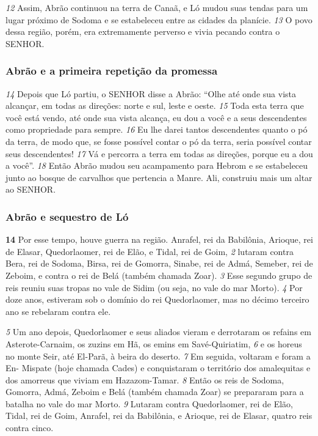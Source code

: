 \bigskip
\textit{\tiny 12}
Assim, Abrão continuou na terra de Canaã, e Ló
mudou suas tendas para um lugar próximo de Sodoma e se estabeleceu entre as
cidades da planície. 
\textit{\tiny 13}
O povo dessa região, porém, era extremamente perverso e
vivia pecando contra o SENHOR.

\bigskip
\subsubsection*{Abrão e a primeira repetição da promessa}
\textit{\tiny 14}
Depois que Ló partiu, o SENHOR disse a Abrão: “Olhe até onde sua vista
alcançar, em todas as direções: norte e sul, leste e oeste. 
\textit{\tiny 15}
Toda esta terra que
você está vendo, até onde sua vista alcança, eu dou a você e a seus descendentes
como propriedade para sempre. 
\textit{\tiny 16}
Eu lhe darei tantos descendentes quanto o pó
da terra, de modo que, se fosse possível contar o pó da terra, seria possível contar
seus descendentes! 
\textit{\tiny 17}
Vá e percorra a terra em todas as direções, porque eu a dou
a você”.
\textit{\tiny 18}
Então Abrão mudou seu acampamento para Hebrom e se estabeleceu junto
ao bosque de carvalhos que pertencia a Manre. Ali, construiu mais um altar ao
SENHOR.


\bigskip
\subsubsection*{Abrão e sequestro de Ló}
\textbf{\large 14}
 Por esse tempo, houve guerra na região. Anrafel, rei da Babilônia, Arioque, rei de Elasar, Quedorlaomer, rei de Elão, e Tidal, rei de Goim, 
\textit{\tiny 2}
lutaram contra Bera, rei de Sodoma, Birsa, rei de Gomorra, Sinabe, rei de Admá,
Semeber, rei de Zeboim, e contra o rei de Belá (também chamada Zoar).
\textit{\tiny 3}
Esse segundo grupo de reis reuniu suas tropas no vale de Sidim (ou seja, no
vale do mar Morto). 
\textit{\tiny 4}
Por doze anos, estiveram sob o domínio do rei
Quedorlaomer, mas no décimo terceiro ano se rebelaram contra ele.

\bigskip
\textit{\tiny 5}
Um   ano depois, Quedorlaomer e seus aliados vieram e derrotaram os refains
em Asterote-Carnaim, os zuzins em Hã, os emins em Savé-Quiriatim,
\textit{\tiny 6}
e os horeus
no monte Seir, até El-Parã, à beira do deserto. 
\textit{\tiny 7}
Em seguida, voltaram e foram a En-
Mispate (hoje chamada Cades) e conquistaram o território dos amalequitas e dos
amorreus que viviam em Hazazom-Tamar.
\textit{\tiny 8}
Então os reis de Sodoma, Gomorra, Admá, Zeboim e Belá (também chamada
Zoar) se prepararam para a batalha no vale do mar Morto.
\textit{\tiny 9}
Lutaram contra
Quedorlaomer, rei de Elão, Tidal, rei de Goim, Anrafel, rei da Babilônia, e Arioque,
rei de Elasar, quatro reis contra cinco. 

